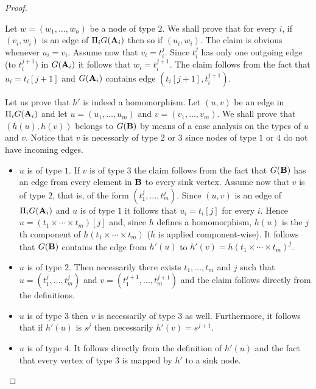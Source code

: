 \documentclass{article}
\newcommand{\aest}{{\bf A}}
\newcommand{\best}{{\bf B}}
\begin{document}
\begin{proof}
\begin{itemize}
Let $w=(w_1,\dots,w_n)$ be a node of type $2$. We shall prove that for every $i$, if $(v_i,w_i)$ is an edge of $\Pi_i G(\aest_i)$ then so
if $(u_i,w_i)$. The claim is obvious whenever $u_i=v_i$. 
Assume now that $v_i=t_i^j$. Since $t_i^j$ has only one outgoing edge (to $t_i^{j+1}$) in $G(\aest_i)$ it follows that 
$w_i=t_i^{j+1}$. The claim follows from the fact that $u_i=t_i[j+1]$ and $G(\aest_i)$ contains edge $(t_i[j+1],t_i^{j+1})$. 
\end{itemize}




Let us prove that $h'$ is indeed a homomorphism. Let $(u,v)$ be an edge in $\Pi_i G(\aest_i)$ and let $u=(u_1,\dots,u_m)$ and $v=(v_1,\dots,v_m)$. We shall prove 
that $(h(u),h(v))$ belongs to $G(\best)$ by means of a case analysis on the types of $u$ and $v$. Notice that $v$ is necessarly of type $2$ or $3$ since nodes of type $1$ or $4$ do not have incoming edges.



\begin{itemize}

\item $u$ is of type $1$. If $v$ is of type $3$ the claim follows from the fact that $G(\best)$ has an edge from every element in $\best$ to every sink vertex. Assume now that $v$ is of type $2$, that is, of the form $(t_1^j,\dots,t_m^j)$.
Since $(u,v)$ is an edge of $\Pi_i G(\aest_i)$ and $u$ is of type $1$ it follows that
$u_i=t_i[j]$ for every $i$. Hence $u=(t_1\times\cdots\times t_m)[j]$ and, since $h$ defines a homomorphism, 
$h(u)$ is the $j$th component of $h(t_1\times\cdots\times t_m)$ ($h$ is applied component-wise). It follows that $G(\best)$ contains the edge from $h'(u)$ to
$h'(v)=h(t_1\times\cdots\times t_m)^j$.



\item $u$ is of type $2$. Then necessarily there exists $t_1,\dots,t_m$ and $j$ such that $u=(t_1^j,\dots,t_m^j)$ and $v=(t_1^{j+1},\dots,t_m^{j+1})$ and the claim follows directly from the definitions.

\item $u$ is of type $3$ then $v$ is necessarily of type $3$ as well. Furthermore, it follows that if $h'(u)$ is $s^j$ then necessarily $h'(v)=s^{j+1}$.




\item $u$ is of type $4$. It follows directly from the definition of $h'(u)$ and the fact that every vertex of type $3$ is mapped by $h'$ to a sink node.
\end{itemize}
 

\end{proof}
\end{document}
